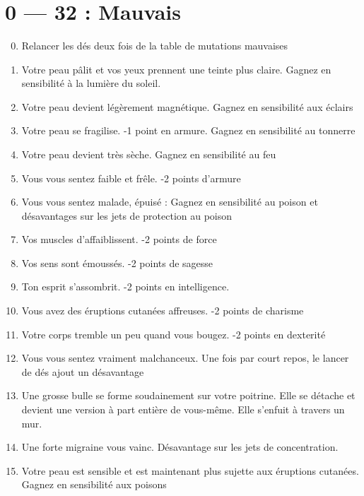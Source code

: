 \documentclass{article}
\begin{document}
\title{\vspace{-0.5cm}{\Huge Mutations} \vspace{-1cm}}

\date{}

\maketitle

\section*{0 --- 32 : Mauvais}
\begin{enumerate}
	\setcounter{enumi}{-1}
	\item Relancer les dés deux fois de la table de mutations mauvaises
	\item Votre peau pâlit et vos yeux prennent une teinte plus claire. Gagnez en sensibilité à la lumière du soleil.
	\item Votre peau devient légèrement magnétique. Gagnez en sensibilité aux éclairs
	\item Votre peau se fragilise. -1 point en armure. Gagnez en sensibilité au tonnerre
	\item Votre peau devient très sèche. Gagnez en sensibilité au feu
	\item Vous vous sentez faible et frêle. -2 points d’armure
	\item Vous vous sentez malade, épuisé : Gagnez en sensibilité au poison et désavantages sur les jets de protection au poison
	\item Vos muscles d’affaiblissent. -2 points de force
	\item Vos sens sont émoussés. -2 points de sagesse
	\item Ton esprit s’assombrit. -2 points en intelligence.
	\item Vous avez des éruptions cutanées affreuses. -2 points de charisme
	\item Votre corps tremble un peu quand vous bougez. -2 points en dexterité
	\item Vous vous sentez vraiment malchanceux. Une fois par court repos, le lancer de dés ajout un désavantage
	\item Une grosse bulle se forme soudainement sur votre poitrine. Elle se détache et devient une version à part entière de vous-même. Elle s'enfuit à travers un mur.
	\item Une forte migraine vous vainc. Désavantage sur les jets de concentration.
	\item Votre peau est sensible et est maintenant plus sujette aux éruptions cutanées. Gagnez en sensibilité aux poisons

\end{enumerate}
\end{document}
